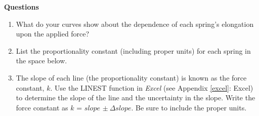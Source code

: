 \pagebreak

\textbf{Questions}
\begin{enumerate}[labparts]
\item What do your curves show about the dependence of each spring's elongation upon the applied force?
\vspace{30mm}

\item List the proportionality constant (including proper units) for each spring in the space below.
\vspace{30mm}

\item The slope of each line (the proportionality constant) is known as the 
force constant, $k$. Use the LINEST function in \textit{Excel} (see Appendix \ref{excel}:
 Excel) to determine the slope of the line and the uncertainty in the slope. 
Write the force constant as $k$ = $slope$ \( \pm \ \Delta  slope\).  Be sure to 
include the proper units.
\end{enumerate}
